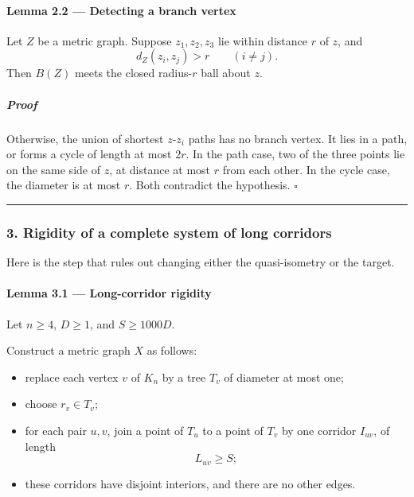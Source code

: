 \documentclass[
  11pt,
  a4paper,
]{article}
\providecommand{\tightlist}{%
  \setlength{\itemsep}{0pt}\setlength{\parskip}{0pt}}
\begin{document}
\paragraph{Lemma 2.2 --- Detecting a branch
vertex}\label{lemma-2.2-detecting-a-branch-vertex}

Let \(Z\) be a metric graph. Suppose \(z_1,z_2,z_3\) lie within distance
\(r\) of \(z\), and \[
d_Z(z_i,z_j)>r\qquad(i\ne j).
\] Then \(B(Z)\) meets the closed radius-\(r\) ball about \(z\).

\subparagraph{Proof}\label{proof-2}

Otherwise, the union of shortest \(z\)-\(z_i\) paths has no branch
vertex. It lies in a path, or forms a cycle of length at most \(2r\). In
the path case, two of the three points lie on the same side of \(z\), at
distance at most \(r\) from each other. In the cycle case, the diameter
is at most \(r\). Both contradict the hypothesis. \(\square\)

\begin{center}\rule{0.5\linewidth}{0.5pt}\end{center}

\subsubsection{3. Rigidity of a complete system of long
corridors}\label{rigidity-of-a-complete-system-of-long-corridors}

Here is the step that rules out changing either the quasi-isometry or
the target.

\paragraph{Lemma 3.1 --- Long-corridor
rigidity}\label{lemma-3.1-long-corridor-rigidity}

Let \(n\ge4\), \(D\ge1\), and \(S\ge1000D\).

Construct a metric graph \(X\) as follows:

\begin{itemize}
\tightlist
\item
  replace each vertex \(v\) of \(K_n\) by a tree \(T_v\) of diameter at
  most one;
\item
  choose \(r_v\in T_v\);
\item
  for each pair \(u,v\), join a point of \(T_u\) to a point of \(T_v\)
  by one corridor \(I_{uv}\), of length \[
  L_{uv}\ge S;
  \]
\item
  these corridors have disjoint interiors, and there are no other edges.
\end{itemize}
\end{document}

